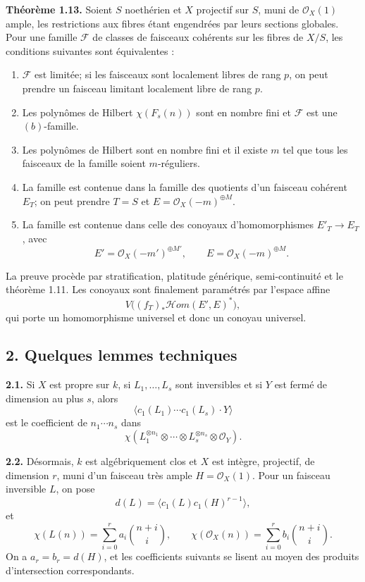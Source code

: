 \documentclass[11pt]{article}
\begin{document}
\textbf{Th\'eor\`eme 1.13.} Soient $S$ noeth\'erien et $X$ projectif sur $S$, muni de $\mathcal O_X(1)$ ample, les restrictions aux fibres \'etant engendr\'ees par leurs sections globales. Pour une famille $\mathcal F$ de classes de faisceaux coh\'erents sur les fibres de $X/S$, les conditions suivantes sont \'equivalentes :
\begin{enumerate}[label=\roman*)]
\item $\mathcal F$ est limit\'ee; si les faisceaux sont localement libres de rang $p$, on peut prendre un faisceau limitant localement libre de rang $p$.
\item Les polyn\^omes de Hilbert $\chi(F_s(n))$ sont en nombre fini et $\mathcal F$ est une $(b)$-famille.
\item Les polyn\^omes de Hilbert sont en nombre fini et il existe $m$ tel que tous les faisceaux de la famille soient $m$-r\'eguliers.
\item La famille est contenue dans la famille des quotients d'un faisceau coh\'erent $E_T$; on peut prendre $T=S$ et $E=\mathcal O_X(-m)^{\oplus M}$.
\item La famille est contenue dans celle des conoyaux d'homomorphismes $E'_T\to E_T$, avec
\[
 E'=\mathcal O_X(-m')^{\oplus M'},\qquad E=\mathcal O_X(-m)^{\oplus M}.
\]
\end{enumerate}
La preuve proc\`ede par stratification, platitude g\'en\'erique, semi-continuit\'e et le th\'eor\`eme 1.11. Les conoyaux sont finalement param\'etr\'es par l'espace affine
\[
 V\bigl((f_T)_*\mathcal H\!om(E',E)^*\bigr),
\]
qui porte un homomorphisme universel et donc un conoyau universel.

\subsection*{2. Quelques lemmes techniques}
\textbf{2.1.} Si $X$ est propre sur $k$, si $L_1,\ldots,L_s$ sont inversibles et si $Y$ est ferm\'e de dimension au plus $s$, alors
\[
 \langle c_1(L_1)\cdots c_1(L_s)\cdot Y\rangle
\]
est le coefficient de $n_1\cdots n_s$ dans
\[
 \chi(L_1^{\otimes n_1}\otimes\cdots\otimes L_s^{\otimes n_s}\otimes\mathcal O_Y).
\]

\textbf{2.2.} D\'esormais, $k$ est alg\'ebriquement clos et $X$ est int\`egre, projectif, de dimension $r$, muni d'un faisceau tr\`es ample $H=\mathcal O_X(1)$. Pour un faisceau inversible $L$, on pose
\[
 d(L)=\langle c_1(L)c_1(H)^{r-1}\rangle,
\]
et
\[
 \chi(L(n))=\sum_{i=0}^r a_i\binom{n+i}{i},\qquad
 \chi(\mathcal O_X(n))=\sum_{i=0}^r b_i\binom{n+i}{i}.
\]
On a $a_r=b_r=d(H)$, et les coefficients suivants se lisent au moyen des produits d'intersection correspondants.
\end{document}
